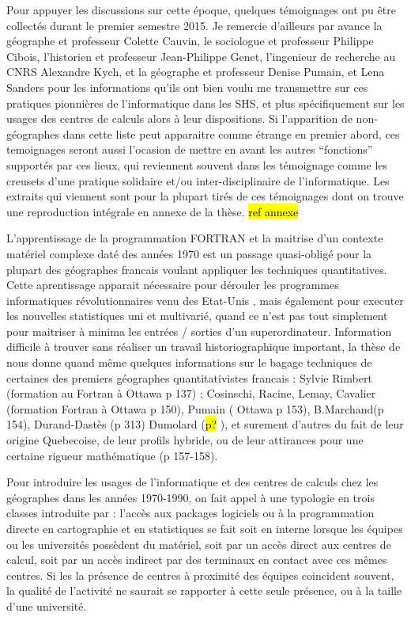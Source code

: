 Pour appuyer les discussions sur cette époque, quelques témoignages ont pu être collectés durant le premier semestre 2015. Je remercie d'ailleurs par avance la géographe et professeur Colette Cauvin, le sociologue et professeur Philippe Cibois, l'historien et professeur Jean-Philippe Genet, l'ingenieur de recherche au CNRS Alexandre Kych, et la géographe et professeur Denise Pumain, et Lena Sanders pour les informations qu'ils ont bien voulu me transmettre sur ces pratiques pionnières de l'informatique dans les SHS, et plus spécifiquement sur les usages des centres de calculs alors à leur dispositions. Si l'apparition de non-géographes dans cette liste peut apparaitre comme étrange en premier abord, ces temoignages seront aussi l'ocasion de mettre en avant les autres \enquote{fonctions} supportés par ces lieux, qui reviennent souvent dans les témoignage comme les creusets d'une pratique solidaire et/ou inter-disciplinaire de l'informatique. Les extraits qui viennent sont pour la plupart tirés de ces témoignages dont on trouve une reproduction intégrale en annexe de la thèse. \hl{ref annexe}

L'apprentissage de la programmation FORTRAN et la maitrise d'un contexte matériel complexe daté des années 1970 est un passage quasi-obligé pour la plupart des géographes francais voulant appliquer les techniques quantitatives. Cette aprentissage apparait nécessaire pour dérouler les programmes informatiques révolutionnaires venu des Etat-Unis \autocite[150,127]{Cuyala2014}, mais également pour executer les nouvelles statistiques uni et multivarié, quand ce n’est pas tout simplement pour maitriser à minima les entrées / sorties d’un superordinateur. Information difficile à trouver sans réaliser un travail historiographique important, la thèse de \textcite{Cuyala2014} nous donne quand même quelques informations sur le bagage techniques de certaines des premiers géographes quantitativistes francais : Sylvie Rimbert (formation au Fortran à Ottawa p 137) ;  Cosinschi, Racine, Lemay, Cavalier (formation Fortran à Ottawa p 150), Pumain ( Ottawa p 153), B.Marchand(p 154), Durand-Dastès (p 313) Dumolard (\hl{p?} ), et surement d’autres du fait de leur origine Quebecoise, de leur profils hybride, ou de leur attirances pour une certaine rigueur mathématique (p 157-158).

Pour introduire les usages de l'informatique et des centres de calculs chez les géographes dans les années 1970-1990, on fait appel à une typologie en trois classes introduite par \textcites{Wieber1980}[448]{Joliveau2004} : l’accès aux packages logiciels ou à la programmation directe en cartographie et en statistiques se fait soit en interne lorsque les équipes ou les universités possèdent du matériel, soit par un accès direct aux centres de calcul, soit par un accès indirect par des terminaux en contact avec ces mêmes centres. Si les la présence de centres à proximité des équipes coincident souvent, la qualité de l'activité ne saurait se rapporter à cette seule présence, ou à la taille d'une université.

